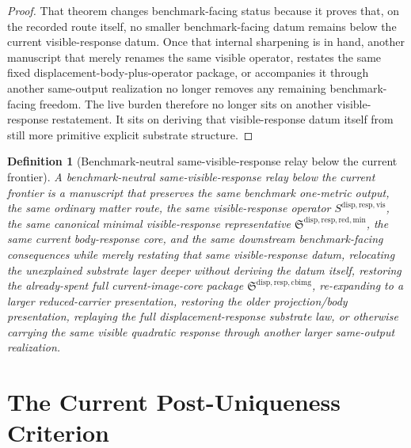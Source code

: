 \documentclass[11pt]{article}
\newcommand{\CurrentBodyImageCore}{\mathfrak S^{\mathrm{disp,resp,cbimg}}}
\newcommand{\VisibleResponseOperator}{S^{\mathrm{disp,resp,vis}}}
\newcommand{\MinimalReducedStructure}{\mathfrak S^{\mathrm{disp,resp,red,min}}}
\newtheorem{definition}{Definition}
\begin{document}
\begin{proof}
That theorem changes benchmark-facing status because it proves that, on the recorded route itself, no smaller benchmark-facing datum remains below the current visible-response datum. Once that internal sharpening is in hand, another manuscript that merely renames the same visible operator, restates the same fixed displacement-body-plus-operator package, or accompanies it through another same-output realization no longer removes any remaining benchmark-facing freedom. The live burden therefore no longer sits on another visible-response restatement. It sits on deriving that visible-response datum itself from still more primitive explicit substrate structure.
\end{proof}

\begin{definition}[Benchmark-neutral same-visible-response relay below the current frontier]
A \emph{benchmark-neutral same-visible-response relay below the current frontier} is a manuscript that preserves the same benchmark one-metric output, the same ordinary matter route, the same visible-response operator \(\VisibleResponseOperator\), the same canonical minimal visible-response representative \(\MinimalReducedStructure\), the same current body-response core, and the same downstream benchmark-facing consequences while merely restating that same visible-response datum, relocating the unexplained substrate layer deeper without deriving the datum itself, restoring the already-spent full current-image-core package \(\CurrentBodyImageCore\), re-expanding to a larger reduced-carrier presentation, restoring the older projection/body presentation, replaying the full displacement-response substrate law, or otherwise carrying the same visible quadratic response through another larger same-output realization.
\end{definition}

\section{The Current Post-Uniqueness Criterion}
\end{document}
